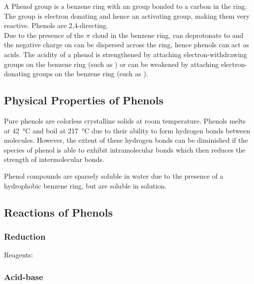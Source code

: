 \documentclass[../main]{subfiles}
\begin{document}
	A Phenol group is a benzene ring with an  group bonded to a carbon in the ring. \\

	The  group is electron donating and hence an activating group, making them very reactive. Phenols are 2,4-directing. \\

	Due to the presence of the \(\pi\)  cloud in the benzene ring,  can deprotonate to  and the negative charge on  can be dispersed across the ring, hence phenols can act as acids. The acidity of a phenol is strengthened by attaching electron-withdrawing groups on the benzene ring (such as ) or can be weakened by attaching electron-donating groups on the benzene ring (such as ).

	\subsection{Physical Properties of Phenols}

	Pure phenols are colorless crystalline solids at room temperature. Phenols melts at \SI{42}{\celsius} and boil at \SI{217}{\celsius} due to their ability to form hydrogen bonds between molecules. However, the extent of these hydrogen bonds can be diminished if the species of phenol is able to exhibit intramolecular  bonds which then reduces the strength of intermolecular bonds.

	Phenol compounds are sparsely soluble in water due to the presence of a hydrophobic benzene ring, but are soluble in  solution. \\

	\subsection{Reactions of Phenols}

	\subsubsection{Reduction}

	Reagents:  \\


	\subsubsection{Acid-base}
\end{document}

